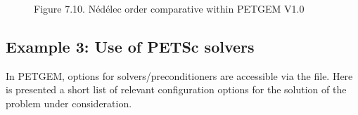 \documentclass[letterpaper,10pt,english]{sphinxmanual}
\begin{document}
\begin{figure}[htbp]
\centering
\capstart

\noindent{}
\caption{Figure 7.10. Nédélec order comparative within PETGEM V1.0}\label{\detokenize{Manual:id23}}\label{\detokenize{Manual:figure-7-10}}\end{figure}


\subsection{Example 3: Use of PETSc solvers}
\label{\detokenize{Manual:example-3-use-of-petsc-solvers}}
In PETGEM, options for  solvers/preconditioners
are accessible via the  file. Here is presented a short list of
relevant configuration options for the solution of the problem under
consideration.
\end{document}
